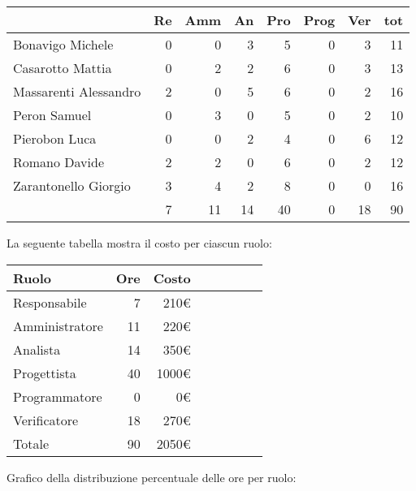 \begin{table}[ht]
    \begin{tabularx}{\linewidth}{X|rrrrrrr}
    \rowcolor{gray!30}& Re & Amm & An & Pro & Prog & Ver & tot \\
    \hline
    Bonavigo Michele                        & 0 & 0 & 3 & 5 & 0 & 3 & 11 \\
    \rowcolor{gray!10}Casarotto Mattia      & 0 & 2 & 2 & 6 & 0 & 3 & 13 \\
    Massarenti Alessandro                   & 2 & 0 & 5 & 6 & 0 & 2 & 16 \\
    \rowcolor{gray!10}Peron Samuel          & 0 & 3 & 0 & 5 & 0 & 2 & 10 \\
    Pierobon Luca                           & 0 & 0 & 2 & 4 & 0 & 6 & 12 \\
    \rowcolor{gray!10}Romano Davide         & 2 & 2 & 0 & 6 & 0 & 2 & 12 \\
    Zarantonello Giorgio                    & 3 & 4 & 2 & 8 & 0 & 0 & 16 \\
    \hline                                  & 7 & 11 & 14 & 40 & 0 & 18 & 90 \\ 
    \end{tabularx}
\end{table}

La seguente tabella mostra il costo per ciascun ruolo:
\begin{table}[ht]
    \begin{tabularx}{\linewidth}{X|rrrrrrr}
    \rowcolor{gray!30}Ruolo & Ore & Costo \\
    \hline
    Responsabile                            & 7 & 210€ \\
    \rowcolor{gray!10}Amministratore        & 11 & 220€ \\
    Analista                                & 14 & 350€ \\
    \rowcolor{gray!10}Progettista           & 40 & 1000€ \\
    Programmatore                           & 0 & 0€ \\
    \rowcolor{gray!10}Verificatore          & 18 & 270€ \\
    \hline Totale                           & 90 & 2050€ \\ 
    \end{tabularx}
\end{table}

Grafico della distribuzione percentuale delle ore per ruolo:
\begin{center}
\end{center}

